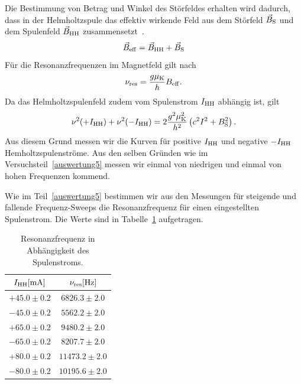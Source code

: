 \documentclass[paper=a4,
	fontsize=10pt,
	DIV=18,
	twocolumn,
	parskip=half
	]{scrartcl}
\numberwithin{equation}{section}    %
\begin{document}
Die Bestimmung von Betrag und Winkel des Störfeldes erhalten wird dadurch, dass in der Helmholtzspule das effektiv wirkende Feld aus dem Störfeld $\vec{B}_{\rm S}$ und dem Spulenfeld $\vec{B}_{\rm HH}$ zusammensetzt~\citep{anleitung}.
\begin{equation}
	\vec{B}_{\rm eff} = \vec{B}_{\rm HH} + \vec{B}_{\rm S}
\end{equation}
Für die Resonanzfrequenzen im Magnetfeld gilt nach~\citet{anleitung}
\begin{equation}
	\nu_{\rm res} = \frac{g\mu_{\rm K}}{h}B_{\rm eff}.
\end{equation}
Da das Helmholtzspulenfeld zudem vom Spulenstrom $I_{\rm HH}$ abhängig ist, gilt~\citep{anleitung}
\begin{equation}
	\nu^2(+I_{\rm HH}) + \nu^2(-I_{\rm HH}) = 2\frac{g^2\mu_{\rm K}^2}{h^2}\left( c^2I^2 + B^2_{\rm S} \right).
	\label{eq.stoerfeld}
\end{equation}
Aus diesem Grund messen wir die Kurven für positive $I_{\rm HH}$ und negative $-I_{\rm HH}$ Hemholtzspulenströme. Aus den selben Gründen wie im Versuchsteil~\ref{auswertung5} messen wir einmal von niedrigen und einmal von hohen Frequenzen kommend.

Wie im Teil~\ref{auswertung5} bestimmen wir aus den Messungen für steigende und fallende Frequenz-Sweeps die Resonanzfrequenz für einen eingestellten Spulenstrom. Die Werte sind in Tabelle~\ref{tab.helmholtzfrequenz} aufgetragen.

\begin{table}[htp]
	\begin{center}	
	\begin{tabular}{cc}
		\hline
		$I_{\rm HH}[\mathrm{mA}]$ & $\nu_{\rm res}[\mathrm{Hz}]$\\
		\hline	
		$+ 45.0 \pm 0.2$   & $ 6826.3 \pm 2.0$\\
		$- 45.0 \pm 0.2$   & $ 5562.2 \pm 2.0$\\
		$+ 65.0 \pm 0.2$   & $ 9480.2 \pm 2.0$\\
		$- 65.0 \pm 0.2$   & $ 8207.7 \pm 2.0$\\
		$+ 80.0 \pm 0.2$   & $11473.2 \pm 2.0$\\
		$- 80.0 \pm 0.2$   & $10195.6 \pm 2.0$\\
		\hline
	\end{tabular}	
	\caption{Resonanzfrequenz in Abhängigkeit des Spulenstroms.}
	\label{tab.helmholtzfrequenz}
	\end{center}
\end{table}
\end{document}
